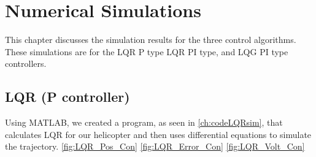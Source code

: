 \chapter{Numerical Simulations}
\label{ch: Chapter4}
This chapter discusses the simulation results for the three control algorithms.  These simulations are for the LQR P type LQR PI type, and LQG PI type controllers.
\section{LQR (P controller)}
Using MATLAB, we created a program, as seen in \ref{ch:codeLQRsim}, that calculates LQR for our helicopter and then uses differential equations to simulate the trajectory. \ref{fig:LQR_Pos_Con} \ref{fig:LQR_Error_Con}  \ref{fig:LQR_Volt_Con}  

